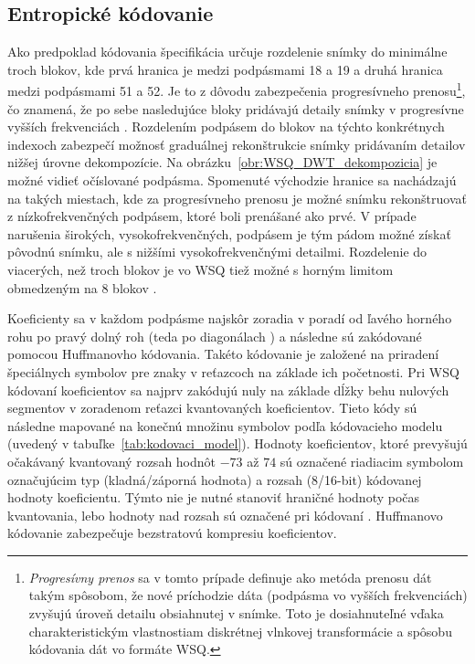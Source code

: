   \subsection{Entropické kódovanie}
  Ako predpoklad kódovania špecifikácia určuje rozdelenie snímky do minimálne troch blokov, kde prvá hranica je medzi podpásmami 18 a 19 a druhá
  hranica medzi podpásmami 51 a 52. Je to z dôvodu zabezpečenia progresívneho prenosu\footnote{\emph{Progresívny prenos} sa v tomto prípade definuje ako
  metóda prenosu dát takým spôsobom, že nové príchodzie dáta (podpásma vo vyšších frekvenciách) zvyšujú úroveň detailu obsiahnutej v snímke.
  Toto je dosiahnuteľné vďaka charakteristickým vlastnostiam diskrétnej vlnkovej transformácie a spôsobu kódovania dát vo formáte WSQ.}, čo znamená,
  že po sebe nasledujúce bloky pridávajú detaily snímky v progresívne vyšších frekvenciách \cite{WSQSpecification}. Rozdelením podpásem do blokov na týchto
  konkrétnych indexoch zabezpečí možnosť graduálnej rekonštrukcie snímky pridávaním detailov nižšej úrovne dekompozície.
  Na obrázku~{\ref{obr:WSQ_DWT_dekompozicia}} je možné vidieť očíslované podpásma. Spomenuté východzie hranice sa nachádzajú na takých miestach, kde za
  progresívneho prenosu je možné snímku rekonštruovať z nízkofrekvenčných podpásem, ktoré boli prenášané ako prvé. V prípade narušenia širokých,
  vysokofrekvenčných, podpásem je tým pádom možné získať pôvodnú snímku, ale s nižšími vysokofrekvenčnými detailmi.
  Rozdelenie do viacerých, než troch blokov je vo WSQ tiež možné s horným limitom obmedzeným
  na 8 blokov \cite{brislawn1996compression}.

  Koeficienty sa v každom podpásme najskôr zoradia v poradí od ľavého horného rohu po pravý dolný roh (teda po diagonálach )
  a následne sú zakódované pomocou Huffmanovho kódovania. Takéto kódovanie je založené na priradení špeciálnych symbolov pre znaky v reťazcoch na základe
  ich početnosti. Pri WSQ kódovaní koeficientov sa najprv zakódujú nuly na základe dĺžky behu nulových segmentov v zoradenom reťazci kvantovaných koeficientov.
  Tieto kódy sú následne mapované na konečnú množinu symbolov podľa kódovacieho modelu (uvedený v tabuľke~{\ref{tab:kodovaci_model}}). Hodnoty koeficientov,
  ktoré prevyšujú očakávaný kvantovaný rozsah hodnôt $-73$ až $74$ sú označené riadiacim symbolom označujúcim typ (kladná/záporná hodnota) a rozsah (8/16-bit)
  kódovanej hodnoty koeficientu. Týmto nie je nutné stanoviť hraničné hodnoty počas kvantovania, lebo hodnoty nad rozsah sú označené pri
  kódovaní \cite{brislawn1996compression}. Huffmanovo kódovanie zabezpečuje bezstratovú kompresiu koeficientov.

